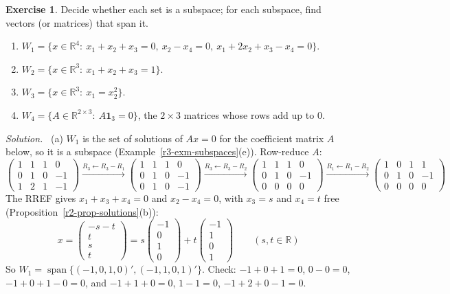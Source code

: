 \documentclass[12pt]{article}
\newcommand{\R}{\mathbb R}
\newcommand{\one}{\mathbf 1}
\DeclareMathOperator{\Span}{span}
\theoremstyle{definition}
\newtheorem{exercise}{Exercise}
\newenvironment{solution}{\par\noindent\textit{Solution.}\ }{\par\smallskip}
\begin{document}
\begin{exercise}\label{r3-dr-subspaces}
Decide whether each set is a subspace; for each subspace, find vectors (or matrices) that span it.
\begin{enumerate}
\item \(W_1=\{x\in\R^4:\ x_1+x_2+x_3=0,\ x_2-x_4=0,\ x_1+2x_2+x_3-x_4=0\}\).
\item \(W_2=\{x\in\R^3:\ x_1+x_2+x_3=1\}\).
\item \(W_3=\{x\in\R^3:\ x_1=x_2^2\}\).
\item \(W_4=\{A\in\R^{2\times3}:\ A\one_3=0\}\), the \(2\times3\) matrices whose rows add up to \(0\).
\end{enumerate}
\end{exercise}
\begin{solution}
(a) \(W_1\) is the set of solutions of \(Ax=0\) for the coefficient matrix \(A\) below, so it is a
subspace (Example~\ref{r3-exm-subspaces}(e)). Row-reduce \(A\):
\[
\begin{pmatrix}1&1&1&0\\0&1&0&-1\\1&2&1&-1\end{pmatrix}
\xrightarrow{R_3\leftarrow R_3-R_1}
\begin{pmatrix}1&1&1&0\\0&1&0&-1\\0&1&0&-1\end{pmatrix}
\xrightarrow{R_3\leftarrow R_3-R_2}
\begin{pmatrix}1&1&1&0\\0&1&0&-1\\0&0&0&0\end{pmatrix}
\xrightarrow{R_1\leftarrow R_1-R_2}
\begin{pmatrix}1&0&1&1\\0&1&0&-1\\0&0&0&0\end{pmatrix}
\]
The RREF gives \(x_1+x_3+x_4=0\) and \(x_2-x_4=0\), with \(x_3=s\) and \(x_4=t\) free
(Proposition~\ref{r2-prop-solutions}(b)):
\[
x=\begin{pmatrix}-s-t\\t\\s\\t\end{pmatrix}=s\begin{pmatrix}-1\\0\\1\\0\end{pmatrix}+t\begin{pmatrix}-1\\1\\0\\1\end{pmatrix}
\qquad(s,t\in\R)
\]
So \(W_1=\Span\{(-1,0,1,0)',(-1,1,0,1)'\}\). Check: \(-1+0+1=0\), \(0-0=0\), \(-1+0+1-0=0\), and
\(-1+1+0=0\), \(1-1=0\), \(-1+2+0-1=0\).


\end{solution}
\end{document}
